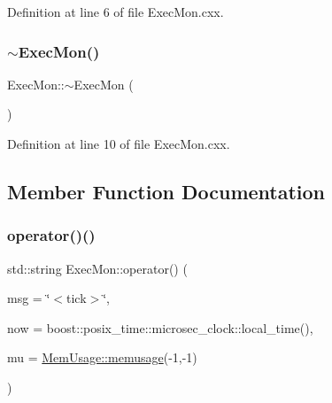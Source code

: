 Definition at line 6 of file Exec\+Mon.\+cxx.

\mbox{\label{class_wire_cell_1_1_exec_mon_a0a76667527008a5eabb5901af4c88521}} 
\subsubsection{\texorpdfstring{$\sim$\+Exec\+Mon()}{~ExecMon()}}
{\footnotesize\ttfamily Exec\+Mon\+::$\sim$\+Exec\+Mon (\begin{DoxyParamCaption}{ }\end{DoxyParamCaption})}



Definition at line 10 of file Exec\+Mon.\+cxx.



\subsection{Member Function Documentation}
\mbox{\label{class_wire_cell_1_1_exec_mon_a5c5ea20b413d06cf43a844ebdb6f847e}} 
\subsubsection{\texorpdfstring{operator()()}{operator()()}}
{\footnotesize\ttfamily std\+::string Exec\+Mon\+::operator() (\begin{DoxyParamCaption}\item[{std\+::string}]{msg = {\ttfamily \char`\"{}$<$tick$>$\char`\"{}},  }\item[{\hyperlink{class_wire_cell_1_1_time_keeper_a3600404e97a1581a1c2630f92f490603}{Time\+Keeper\+::ptime}}]{now = {\ttfamily boost\+:\+:posix\+\_\+time\+:\+:microsec\+\_\+clock\+:\+:local\+\_\+time()},  }\item[{\hyperlink{class_wire_cell_1_1_mem_usage_ab022bc829c4166d0161f3c91195f062f}{Mem\+Usage\+::memusage}}]{mu = {\ttfamily \hyperlink{class_wire_cell_1_1_mem_usage_ab022bc829c4166d0161f3c91195f062f}{Mem\+Usage\+::memusage}(-\/1,-\/1)} }\end{DoxyParamCaption})}



